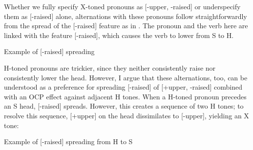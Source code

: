 \documentclass[output=paper]{langsci/langscibook}
\begin{document}
Whether we fully specify X-toned pronouns as [-upper, -raised] or underspecify them as [-raised] alone, alternations with these pronouns follow straightforwardly from the spread of the [-raised] feature as in . The pronoun and the verb here are linked with the feature [-raised], which causes the verb to lower from S to H. 

\ea\label{ex:mcpherson:22} Example of [-raised] spreading \\
\z


H-toned pronouns are trickier, since they neither consistently raise nor consistently lower the head. However, I argue that these alternations, too, can be understood as a preference for spreading [-raised] of [+upper, -raised] combined with an OCP effect against adjacent H tones. When a H-toned pronoun precedes an S head, [-raised] spreads. However, this creates a sequence of two H tones; to resolve this sequence, [+upper] on the head dissimilates to [-upper], yielding an X tone:

\ea\label{ex:mcpherson:23} Example of [-raised] spreading from H to S \\
\z
\end{document}

